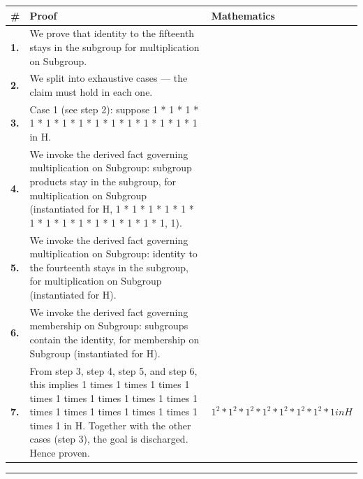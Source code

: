 \documentclass[11pt]{article}
\theoremstyle{definition}
\begin{document}
\begin{tabular}{@{} >{\raggedright\arraybackslash}p{} >{\raggedright\arraybackslash}p{} >{\raggedleft\arraybackslash}p{} @{}}
\textbf{\#} & \textbf{Proof} & \textbf{Mathematics} \\
\midrule
\textbf{1.} & We prove that identity to the fifteenth stays in the subgroup for multiplication on Subgroup. & \\[0.45em]
\textbf{2.} & We split into exhaustive cases — the claim must hold in each one. & \\[0.45em]
\textbf{3.} & Case 1 (see step 2): suppose 1 * 1 * 1 * 1 * 1 * 1 * 1 * 1 * 1 * 1 * 1 * 1 * 1 * 1 in H. & \\[0.45em]
\textbf{4.} & We invoke the derived fact governing multiplication on Subgroup: subgroup products stay in the subgroup, for multiplication on Subgroup (instantiated for H, 1 * 1 * 1 * 1 * 1 * 1 * 1 * 1 * 1 * 1 * 1 * 1 * 1 * 1, 1). & \\[0.45em]
\textbf{5.} & We invoke the derived fact governing multiplication on Subgroup: identity to the fourteenth stays in the subgroup, for multiplication on Subgroup (instantiated for H). & \\[0.45em]
\textbf{6.} & We invoke the derived fact governing membership on Subgroup: subgroups contain the identity, for membership on Subgroup (instantiated for H). & \\[0.45em]
\textbf{7.} & From step 3, step 4, step 5, and step 6, this implies 1 times 1 times 1 times 1 times 1 times 1 times 1 times 1 times 1 times 1 times 1 times 1 times 1 times 1 times 1 in H. Together with the other cases (step 3), the goal is discharged. Hence proven. & $\displaystyle 1^{2} * 1^{2} * 1^{2} * 1^{2} * 1^{2} * 1^{2} * 1^{2} * 1 in H$ \\[0.45em]
\bottomrule
\end{tabular}
\label{thm:Subgroup-multiplication-identity_to_the_fifteenth_stays_in_the_subgroup}
\par\medskip\hrule
\end{document}

